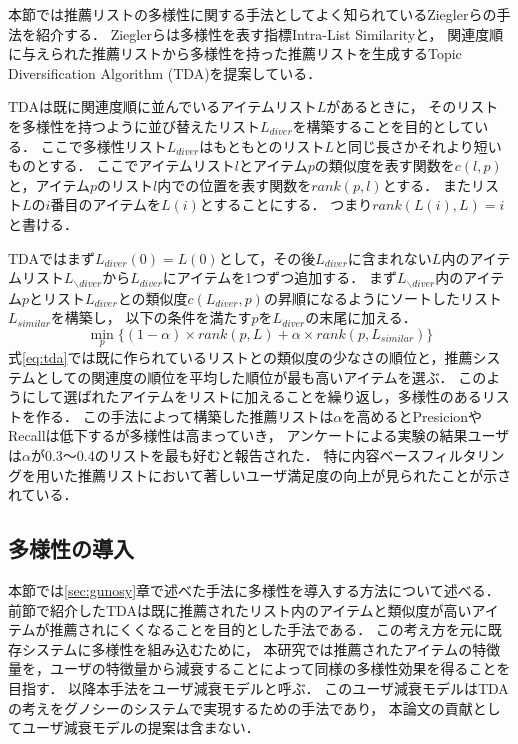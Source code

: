 \documentclass[japanese]{jnlp_1.4}
\begin{document}
本節では推薦リストの多様性に関する手法としてよく知られているZieglerらの手法を紹介する\cite{ziegler2005}．
Zieglerらは多様性を表す指標Intra-List Similarityと，
関連度順に与えられた推薦リストから多様性を持った推薦リストを生成するTopic Diversification Algorithm (TDA)を提案している．

TDAは既に関連度順に並んでいるアイテムリスト$L$があるときに，
そのリストを多様性を持つように並び替えたリスト$L_{diver}$を構築することを目的としている．
ここで多様性リスト$L_{diver}$はもともとのリスト$L$と同じ長さかそれより短いものとする．
ここでアイテムリスト$l$とアイテム$p$の類似度を表す関数を$c(l, p)$と，アイテム$p$のリスト$l$内での位置を表す関数を$rank(p, l)$とする．
またリスト$L$の$i$番目のアイテムを$L(i)$とすることにする．
つまり$rank(L(i), L) = i$と書ける．

TDAではまず$L_{diver}(0)=L(0)$として，その後$L_{diver}$に含まれない$L$内のアイテムリスト$L_{\backslash diver}$から$L_{diver}$にアイテムを1つずつ追加する．
まず$L_{\backslash diver}$内のアイテム$p$とリスト$L_{diver}$との類似度$c(L_{diver}, p)$の昇順になるようにソートしたリスト$L_{similar}$を構築し，
以下の条件を満たす$p$を$L_{diver}$の末尾に加える．
\begin{equation}\label{eq:tda}
	\min_{p} \bigl\{ (1 - \alpha) \times rank(p, L) + \alpha \times rank(p, L_{similar}) \bigr\}
\end{equation}
式\ref{eq:tda}では既に作られているリストとの類似度の少なさの順位と，推薦システムとしての関連度の順位を平均した順位が最も高いアイテムを選ぶ．
このようにして選ばれたアイテムをリストに加えることを繰り返し，多様性のあるリストを作る．
この手法によって構築した推薦リストは$\alpha$を高めるとPresicionやRecallは低下するが多様性は高まっていき，
アンケートによる実験の結果ユーザは$\alpha$が0.3〜0.4のリストを最も好むと報告された．
特に内容ベースフィルタリングを用いた推薦リストにおいて著しいユーザ満足度の向上が見られたことが示されている．


\subsection{多様性の導入}

本節では\ref{sec:gunosy}章で述べた手法に多様性を導入する方法について述べる．
前節で紹介したTDAは既に推薦されたリスト内のアイテムと類似度が高いアイテムが推薦されにくくなることを目的とした手法である．
この考え方を元に既存システムに多様性を組み込むために，
本研究では推薦されたアイテムの特徴量を，ユーザの特徴量から減衰することによって同様の多様性効果を得ることを目指す．
以降本手法をユーザ減衰モデルと呼ぶ．
このユーザ減衰モデルはTDAの考えをグノシーのシステムで実現するための手法であり，
本論文の貢献としてユーザ減衰モデルの提案は含まない．
\end{document}
